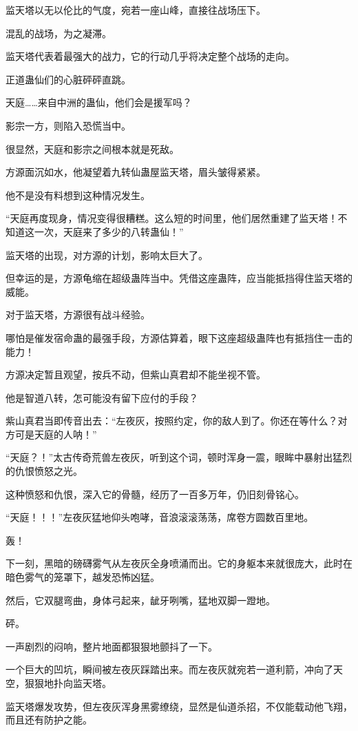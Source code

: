 \begin{this_body}
监天塔以无以伦比的气度，宛若一座山峰，直接往战场压下。

混乱的战场，为之凝滞。

监天塔代表着最强大的战力，它的行动几乎将决定整个战场的走向。

正道蛊仙们的心脏砰砰直跳。

天庭……来自中洲的蛊仙，他们会是援军吗？

影宗一方，则陷入恐慌当中。

很显然，天庭和影宗之间根本就是死敌。

方源面沉如水，他凝望着九转仙蛊屋监天塔，眉头皱得紧紧。

他不是没有料想到这种情况发生。

“天庭再度现身，情况变得很糟糕。这么短的时间里，他们居然重建了监天塔！不知道这一次，天庭来了多少的八转蛊仙！”

监天塔的出现，对方源的计划，影响太巨大了。

但幸运的是，方源龟缩在超级蛊阵当中。凭借这座蛊阵，应当能抵挡得住监天塔的威能。

对于监天塔，方源很有战斗经验。

哪怕是催发宿命蛊的最强手段，方源估算着，眼下这座超级蛊阵也有抵挡住一击的能力！

方源决定暂且观望，按兵不动，但紫山真君却不能坐视不管。

他是智道八转，怎可能没有留下应付的手段？

紫山真君当即传音出去：“左夜灰，按照约定，你的敌人到了。你还在等什么？对方可是天庭的人呐！”

“天庭？！”太古传奇荒兽左夜灰，听到这个词，顿时浑身一震，眼眸中暴射出猛烈的仇恨愤怒之光。

这种愤怒和仇恨，深入它的骨髓，经历了一百多万年，仍旧刻骨铭心。

“天庭！！！”左夜灰猛地仰头咆哮，音浪滚滚荡荡，席卷方圆数百里地。

轰！

下一刻，黑暗的磅礴雾气从左夜灰全身喷涌而出。它的身躯本来就很庞大，此时在暗色雾气的笼罩下，越发恐怖凶猛。

然后，它双腿弯曲，身体弓起来，龇牙咧嘴，猛地双脚一蹬地。

砰。

一声剧烈的闷响，整片地面都狠狠地颤抖了一下。

一个巨大的凹坑，瞬间被左夜灰踩踏出来。而左夜灰就宛若一道利箭，冲向了天空，狠狠地扑向监天塔。

监天塔爆发攻势，但左夜灰浑身黑雾缭绕，显然是仙道杀招，不仅能载动他飞翔，而且还有防护之能。


\end{this_body}
